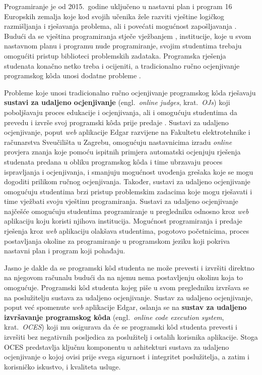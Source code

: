 \documentclass[times, utf8, diplomski]{fer}
\begin{document}
Programiranje je od 2015.\ godine uključeno u nastavni plan i program 16 Europskih zemalja koje kod svojih učenika žele razviti vještine logičkog razmišljanja i rješavanja problema, ali i povećati mogućnost zapošljavanja \citep{balanskat2015computing}. Budući da se vještina programiranja stječe vježbanjem \citep{kurnia2001online}, institucije, koje u svom nastavnom planu i programu nude programiranje, svojim studentima trebaju omogućiti pristup biblioteci problemskih zadataka. Programska rješenja studenata konačno netko treba i ocijeniti, a tradicionalno ručno ocjenjivanje programskog kôda unosi dodatne probleme \citep{kurnia2001online}.

Probleme koje unosi tradicionalno ručno ocjenjivanje programskog kôda rješavaju \textbf{sustavi za udaljeno ocjenjivanje} (engl.\ \textit{online judges}, krat.\ \textit{OJs}) koji poboljšavaju proces edukacije i ocjenjivanja, ali i omogućuju studentima da prevedu  i izvrše  svoj programski kôda prije predaje \citep{wang2021metaoj}. Sustavi za udaljeno ocjenjivanje, poput \textit{web} aplikacije Edgar \citep{mekterovic2020building} razvijene na Fakultetu elektrotehnike i računarstva Sveučilišta u Zagrebu, omogućuju nastavnicima izradu \textit{online} provjera znanja koje pomoću ispitnih primjera automatski ocjenjuju rješenja studenata predana u obliku programskog kôda i time ubrzavaju proces ispravljanja i ocjenjivanja, i smanjuju mogućnost uvođenja grešaka koje se mogu dogoditi prilikom ručnog ocjenjivanja. Također, sustavi za udaljeno ocjenjivanje omogućuju studentima brzi pristup problemskim zadacima koje mogu rješavati i time vježbati svoju vještinu programiranja. Sustavi za udaljeno ocjenjivanje najčešće omogućuju studentima programiranje u pregledniku odnosno kroz \textit{web} aplikaciju koju koristi njihova institucija. Mogućnost programiranja i predaje rješenja kroz \textit{web} aplikaciju olakšava studentima, pogotovo početnicima, proces postavljanja okoline za programiranje u programskom jeziku koji pokriva nastavni plan i program koji pohađaju.

Jasno je dakle da se programski kôd studenta ne može prevesti i izvršiti direktno na njegovom računalu budući da na njemu nema postavljenju okolinu koja to omogućuje. Programski kôd studenta kojeg piše u svom pregledniku izvršava se na poslužitelju sustava za udaljeno ocjenjivanje. Sustav za udaljeno ocjenjivanje, poput već spomenute \textit{web} aplikacije Edgar, oslanja se na \textbf{sustav za udaljeno izvršavanje programskog kôda} (engl.\ \textit{online code execution system}, krat.\ \textit{OCES}) koji mu osigurava da će se programski kôd studenta prevesti i izvršiti bez negativnih posljedica za poslužitelj i ostalih korisnika aplikacije. Stoga OCES predstavlja ključnu komponentu u arhitekturi sustava za udaljeno ocjenjivanje o kojoj ovisi prije svega sigurnost i integritet poslužitelja, a zatim i korisničko iskustvo, i kvaliteta usluge.
\end{document}
